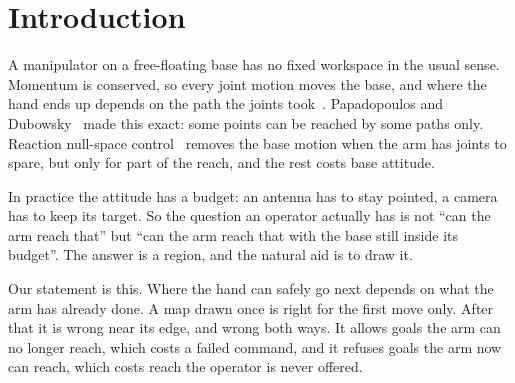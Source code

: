 \documentclass[pdflatex,sn-mathphys-num]{sn-jnl}
\begin{document}
\section{Introduction}
A manipulator on a free-floating base has no fixed workspace in the usual sense. Momentum is conserved, so every
joint motion moves the base, and where the hand ends up depends on the path the joints took~\cite{umetani1989,
dubowsky1993}. Papadopoulos and Dubowsky~\cite{papadopoulos1993} made this exact: some points can be reached by
some paths only. Reaction null-space control~\cite{nenchev1999,yoshida2001} removes the base motion when the arm
has joints to spare, but only for part of the reach, and the rest costs base attitude.

In practice the attitude has a budget: an antenna has to stay pointed, a camera has to keep its target. So the
question an operator actually has is not ``can the arm reach that'' but ``can the arm reach that with the base
still inside its budget''. The answer is a region, and the natural aid is to draw it.

Our statement is this. Where the hand can safely go next depends on what the arm has already done. A map drawn once
is right for the first move only. After that it is wrong near its edge, and wrong both ways. It allows goals the
arm can no longer reach, which costs a failed command, and it refuses goals the arm now can reach, which costs reach
the operator is never offered.
\end{document}
